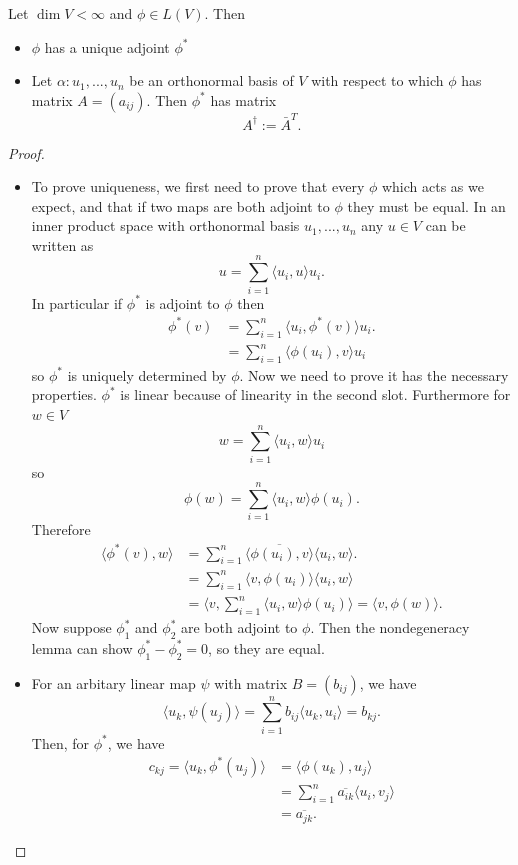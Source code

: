 \begin{prop}
    Let $\dim V < \infty$ and $\phi \in L(V)$. Then
    \begin{itemize}
      \item $\phi$ has a unique adjoint $\phi^*$
      \item Let $\alpha: u_1,...,u_n$ be an orthonormal basis of $V$ with respect to which $\phi$ has matrix $A = (a_{ij})$. Then $\phi^*$ has matrix
        \[A^\dag := \bar{A}^T.\]
    \end{itemize}
\end{prop}
\begin{proof} $ $

  \begin{itemize}

    \item To prove uniqueness, we first need to prove that every $\phi$ which acts as we expect, and that if two maps are both adjoint to $\phi$ they must be equal. In an inner product space with orthonormal basis $u_1,...,u_n$ any $u \in V$ can be written as
      \[u = \sum_{ i = 1}^{n} \langle u_i, u \rangle u_i.\]
      In particular if $\phi^*$ is adjoint to $\phi$ then
      \begin{align*}
        \phi^*(v) &= \sum_{ i = 1}^{n} \langle u_i, \phi^*(v) \rangle u_i. \\
                  &= \sum_{ i = 1}^{n} \langle \phi(u_i), v \rangle u_i
      \end{align*}
      so $\phi^*$ is uniquely determined by $\phi$. Now we need to prove it has the necessary properties.
      $\phi^*$ is linear because of linearity in the second slot. Furthermore for $w \in V$
      \[w = \sum_{ i = 1}^{n} \langle u_i, w \rangle u_i\]
      so \[\phi(w) = \sum_{ i = 1}^{n} \langle u_i, w \rangle \phi(u_i).\]
      Therefore 
      \begin{align*}
        \langle \phi^*(v), w \rangle &= \sum_{ i = 1}^{n} \overline{ \langle \phi(u_i), v \rangle} \langle u_i, w \rangle. \\
         &= \sum_{ i = 1}^{n} \langle v, \phi(u_i) \rangle \langle u_i, w \rangle \\
        &= \langle v, \sum_{ i = 1}^{n} \langle u_i, w \rangle \phi(u_i) \rangle = \langle v, \phi(w) \rangle
      .\end{align*}
      Now suppose $\phi^*_1$ and $\phi^*_2$ are both adjoint to $\phi$. Then the nondegeneracy lemma can show $\phi_1^* - \phi_2^* = 0$, so they are equal.
    \item For an arbitary linear map $\psi$ with matrix $B = (b_{ij})$, we have
      \[\langle u_k, \psi(u_j) \rangle = \sum_{ i = 1}^{n} b_{ij} \langle u_k, u_i \rangle = b_{kj}.\]
      Then, for $\phi^*$, we have
      \begin{align*}
        c_{kj} = \langle u_k, \phi^*(u_j) \rangle &= \langle \phi(u_k), u_j \rangle \\
         &= \sum_{ i = 1}^{n} \overline{a_{ik}} \langle u_i, v_j \rangle \\
         &= \overline{a_{jk}}
      .\end{align*} 
  \end{itemize}
\end{proof}

